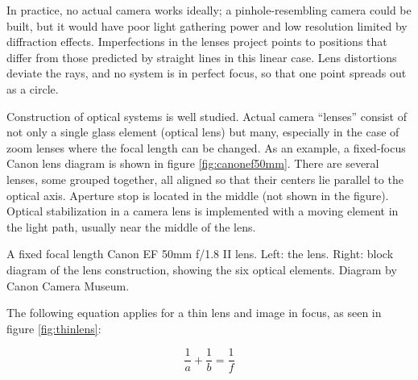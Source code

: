 
In practice, no actual camera works ideally; a pinhole-resembling camera could be built, but it would have poor light gathering power and low resolution limited by diffraction effects. \cite{todo}
Imperfections in the lenses project points to positions that differ from those predicted by straight lines in this linear case.
Lens distortions deviate the rays, and no system is in perfect focus, so that one point spreads out as a circle.

Construction of optical systems is well studied. \cite{kingslake1989history,greenleaf1950photographic}
Actual camera ``lenses'' consist of not only a single glass element (optical lens) but many, especially in the case of zoom lenses where the focal length can be changed.
As an example, a fixed-focus Canon lens diagram is shown in figure \ref{fig:canonef50mm}.
There are several lenses, some grouped together, all aligned so that their centers lie parallel to the optical axis.
Aperture stop is located in the middle (not shown in the figure).
Optical stabilization in a camera lens is implemented with a moving element in the light path, usually near the middle of the lens.


{A fixed focal length Canon EF 50mm f/1.8 II lens. Left: the lens. Right: block diagram of the lens construction, showing the six optical elements. Diagram by Canon Camera Museum.}


The following equation applies for a thin lens and image in focus, as seen in figure \ref{fig:thinlens}:

\begin{equation}
	\frac{1}{a} + \frac{1}{b} = \frac{1}{f} \label{eq:focal}
\end{equation}



